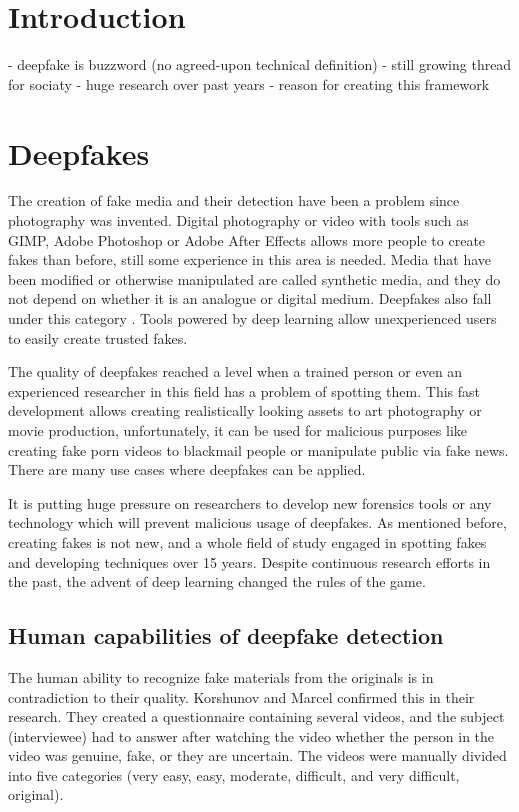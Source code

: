\chapter{Introduction}

- deepfake is buzzword (no agreed-upon technical definition)
- still growing thread for sociaty
- huge research over past years
- reason for creating this framework

\chapter{Deepfakes}

The creation of fake media and their detection have been a problem since photography was invented. Digital photography or video with tools such as GIMP, Adobe Photoshop or Adobe After Effects allows more people to create fakes than before, still some experience in this area is needed. Media that have been modified or otherwise manipulated are called synthetic media, and they do not depend on whether it is an analogue or digital medium. Deepfakes also fall under this category \cite{IncreasingThreatofDeepfakeIdentites}. Tools powered by deep learning allow unexperienced users to easily create trusted fakes. 

The quality of deepfakes reached a level when a trained person or even an experienced researcher in this field has a problem of spotting them. This fast development allows creating realistically looking assets to art photography or movie production, unfortunately, it can be used for malicious purposes like creating fake porn videos to blackmail people or manipulate public via fake news. There are many use cases where deepfakes can be applied.

It is putting huge pressure on researchers to develop new forensics tools or any technology which will prevent malicious usage of deepfakes. As mentioned before, creating fakes is not new, and a whole field of study engaged in spotting fakes and developing techniques over 15 years. Despite continuous research efforts in the past, the advent of deep learning changed the rules of the game. \cite{MediaForensicsandDeepFakes}

\section{Human capabilities of deepfake detection}

The human ability to recognize fake materials from the originals is in contradiction to their quality. Korshunov and Marcel confirmed this in their research. They created a questionnaire containing several videos, and the subject (interviewee) had to answer after watching the video whether the person in the video was genuine, fake, or they are uncertain. The videos were manually divided into five categories (very easy, easy, moderate, difficult, and very difficult, original). 

